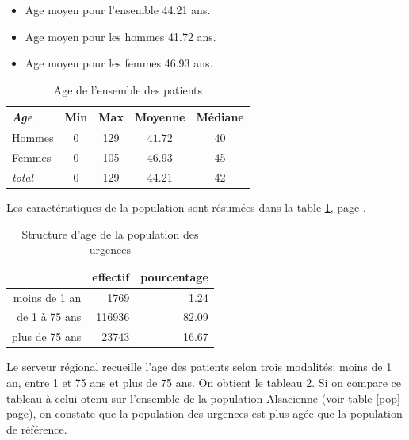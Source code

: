 \documentclass[12pt,english,french]{report}
\begin{document}

\begin{itemize}
  \item Age moyen pour l'ensemble 44.21 ans.
  \item Age moyen pour les hommes 41.72 ans.
  \item Age moyen pour les femmes 46.93 ans. 
\end{itemize}

\begin{table}
\begin{center}
\begin{tabular}{|l|c|c|c|c|}
  \hline
   \emph{Age} & Min & Max & Moyenne & Médiane \\
    \hline
    \hline
    Hommes & $0$ & 129 & $41.72$ & 40 \\
    \hline
    Femmes & 0 & 105 & 46.93 & 45 \\
    \hline
    \emph{total} & 0 & 129 & 44.21 & 42 \\
  \hline
\end{tabular}
\caption{Age de l'ensemble des patients}
\label{summary}
\end{center}
\end{table}

Les caractéristiques de la population sont résumées dans la table \ref{summary}, page \pageref{summary}.





\begin{table}[ht]
\centering
\begin{tabular}{rrr}
  \hline
 & effectif & pourcentage \\ 
  \hline
moins de 1 an & 1769 & 1.24 \\ 
  de 1 à 75 ans & 116936 & 82.09 \\ 
  plus de 75 ans & 23743 & 16.67 \\ 
   \hline
\end{tabular}
\caption{Structure d'age de la population des urgences} 
\label{age:serveur}
\end{table}Le serveur régional recueille l'age des patients selon trois modalités: moins de 1 an, entre 1 et 75 ans et plus de 75 ans. On obtient le tableau \ref{age:serveur}. Si on compare ce tableau à celui otenu sur l'ensemble de la population Alsacienne (voir table \ref{pop} page\pageref{pop}), on constate que la population des urgences est plus agée que la population de référence.
\end{document}
